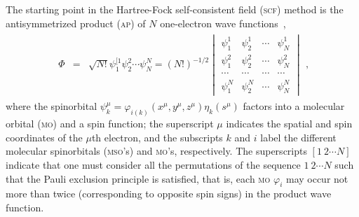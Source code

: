 The starting point in the Hartree-Fock self-consistent field
(\textsc{scf}) method is the antisymmetrized product (\textsc{ap}) of
$N$ one-electron wave functions~\cite{Roothaan_HF},
%
\begin{eqnarray}
  \begin{split}
    \Phi & = & \sqrt{N!}\psi_{1}^{[1} \psi_{2}^{2} \cdots \psi_{N}^{N} =
    (N!)^{-1/2}
    \begin{vmatrix}
      \psi_{1}^{1} & \psi_{2}^{1} & \cdots & \psi_{N}^{1} \\
      \psi_{1}^{2} & \psi_{2}^{2} & \cdots & \psi_{N}^{2} \\
      \cdots & \cdots & \cdots & \cdots \\
      \psi_{1}^{N} & \psi_{2}^{N} & \cdots & \psi_{N}^{N}
    \end{vmatrix}
  \end{split},
  \label{eq:AP}
\end{eqnarray}
%
where the spinorbital $\psi_{k}^{\mu} = \varphi_{i(k)}(x^{\mu},
y^{\mu}, z^{\mu}) \eta_{k}(s^{\mu})$ factors into a molecular orbital
(\textsc{mo}) and a spin function; the superscript $\mu$ indicates the
spatial and spin coordinates of the $\mu$th electron, and the
subscripts $k$ and $i$ label the different molecular spinorbitals
(\textsc{mso}'s) and \textsc{mo}'s, respectively. The superscripts
$[1\ 2 \cdots N]$ indicate that one must consider all the permutations
of the sequence $1\ 2 \cdots N$ such that the Pauli exclusion
principle is satisfied, that is, each \textsc{mo} $\varphi_{i}$ may
occur not more than twice (corresponding to opposite spin signs) in
the product wave function.

